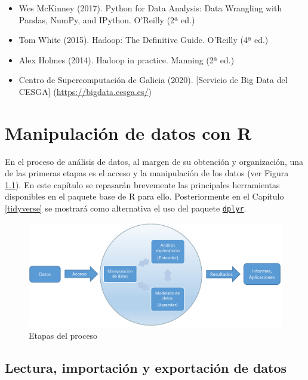\documentclass[
]{book}
\providecommand{\tightlist}{%
  \setlength{\itemsep}{0pt}\setlength{\parskip}{0pt}}
\begin{document}
\begin{itemize}
\tightlist
\item
  Wes McKinney (2017). Python for Data Analysis: Data Wrangling with Pandas, NumPy, and IPython. O'Reilly (2ª ed.)
\item
  Tom White (2015). Hadoop: The Definitive Guide. O'Reilly (4ª ed.)
\item
  Alex Holmes (2014). Hadoop in practice. Manning (2ª ed.)
\item
  Centro de Supercomputación de Galicia (2020). {[}Servicio de Big Data del CESGA{]} (\url{https://bigdata.cesga.es/})
\end{itemize}

\hypertarget{manipR}{%
\chapter{Manipulación de datos con R}\label{manipR}}

En el proceso de análisis de datos, al margen de su obtención y organización, una de las primeras etapas es el acceso y la manipulación de los datos (ver Figura \ref{fig:esquema2}).
En este capítulo se repasarán brevemente las principales herramientas disponibles en el paquete base de R para ello.
Posteriormente en el Capítulo \ref{tidyverse} se mostrará como alternativa el uso del paquete \href{https://dplyr.tidyverse.org/index.html}{\texttt{dplyr}}.

\begin{figure}[!htb]

{\centering \includegraphics[width=0.8\linewidth]{images/esquema2} 

}

\caption{Etapas del proceso}\label{fig:esquema2}
\end{figure}

\hypertarget{read}{%
\section{Lectura, importación y exportación de datos}\label{read}}
\end{document}
